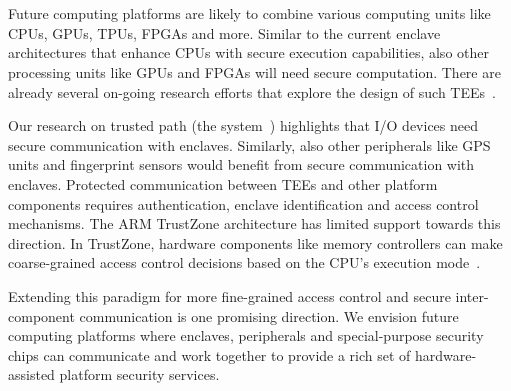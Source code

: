 
\section*{}


Future computing platforms are likely to combine various computing units like CPUs, GPUs, TPUs, FPGAs and more. 
Similar to the current enclave architectures that enhance CPUs with secure execution capabilities, also other processing units like GPUs and FPGAs will need secure computation. There are already several on-going research efforts that explore the design of such TEEs~\cite{volos2018graviton}.

Our research on trusted path (the \protection system~\cite{protection}) highlights that I/O devices need secure communication with enclaves. Similarly, also other peripherals like GPS units and fingerprint sensors would benefit from secure communication with enclaves. Protected communication between TEEs and other platform components requires authentication, enclave identification and access control mechanisms. The ARM TrustZone architecture has limited support towards this direction. In TrustZone, hardware components like memory controllers can make coarse-grained access control decisions based on the CPU's execution mode~\cite{ekberg2014untapped}. 


Extending this paradigm for more fine-grained access control and secure inter-component communication is one promising direction. We envision future computing platforms where enclaves, peripherals and special-purpose security chips can communicate and work together to provide a rich set of hardware-assisted platform security services.
